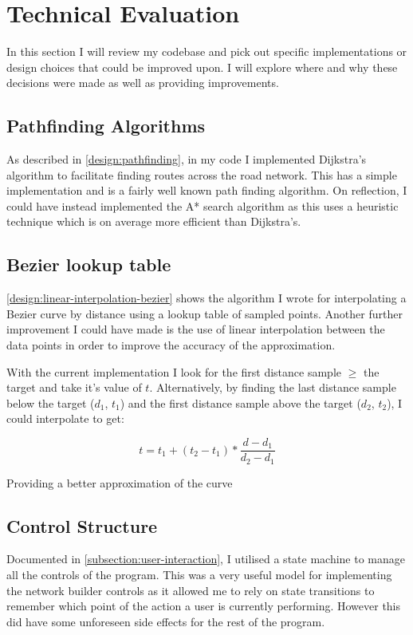 \section{Technical Evaluation}

    In this section I will review my codebase and pick out specific implementations or design choices that could be improved upon. I will explore where and why these decisions were made as well as providing improvements.

    \subsection{Pathfinding Algorithms}

        As described in \autoref{design:pathfinding}, in my code I implemented Dijkstra's algorithm to facilitate finding routes across the road network. This has a simple implementation and is a fairly well known path finding algorithm. On reflection, I could have instead implemented the A* search algorithm as this uses a heuristic technique which is on average more efficient than Dijkstra's.

    \subsection{Bezier lookup table}

        \autoref{design:linear-interpolation-bezier} shows the algorithm I wrote for interpolating a Bezier curve by distance using a lookup table of sampled points. Another further improvement I could have made is the use of linear interpolation between the data points in order to improve the accuracy of the approximation.

        With the current implementation I look for the first distance sample $\geq$ the target and take it's value of $t$. Alternatively, by finding the last distance sample below the target ($d_1$, $t_1$) and the first distance sample above the target ($d_2$, $t_2$), I could interpolate to get:

        \[t = t_1 + (t_2 - t_1) * \frac{d - d_1}{d_2 - d_1}\]

        Providing a better approximation of the curve

    \subsection{Control Structure}

        Documented in \autoref{subsection:user-interaction}, I utilised a state machine to manage all the controls of the program. This was a very useful model for implementing the network builder controls as it allowed me to rely on state transitions to remember which point of the action a user is currently performing. However this did have some unforeseen side effects for the rest of the program.

